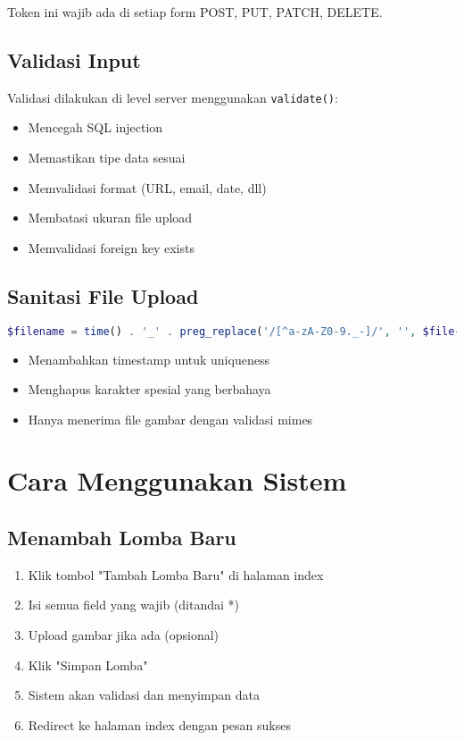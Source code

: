 \documentclass[12pt,a4paper]{article}
\begin{document}
Token ini wajib ada di setiap form POST, PUT, PATCH, DELETE.

\subsection{Validasi Input}

Validasi dilakukan di level server menggunakan \texttt{validate()}:

\begin{itemize}
    \item Mencegah SQL injection
    \item Memastikan tipe data sesuai
    \item Memvalidasi format (URL, email, date, dll)
    \item Membatasi ukuran file upload
    \item Memvalidasi foreign key exists
\end{itemize}

\subsection{Sanitasi File Upload}

\begin{lstlisting}[language=PHP]
$filename = time() . '_' . preg_replace('/[^a-zA-Z0-9._-]/', '', $file->getClientOriginalName());
\end{lstlisting}

\begin{itemize}
    \item Menambahkan timestamp untuk uniqueness
    \item Menghapus karakter spesial yang berbahaya
    \item Hanya menerima file gambar dengan validasi mimes
\end{itemize}

\section{Cara Menggunakan Sistem}

\subsection{Menambah Lomba Baru}

\begin{enumerate}
    \item Klik tombol "Tambah Lomba Baru" di halaman index
    \item Isi semua field yang wajib (ditandai *)
    \item Upload gambar jika ada (opsional)
    \item Klik "Simpan Lomba"
    \item Sistem akan validasi dan menyimpan data
    \item Redirect ke halaman index dengan pesan sukses
\end{enumerate}
\end{document}

